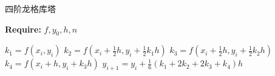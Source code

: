 \begin{algorithm}
\caption{四阶龙格库塔}
\label{alg:runge_kutta_4th}
{\bf Require:} $f, y_0, h, n$
\begin{algorithmic}[1]
	\State $k_1=f(x_i,y_i)$
	\State $k_2=f(x_i+\frac{1}{2}h,y_i+\frac{1}{2}k_1h)$
	\State $k_3=f(x_i+\frac{1}{2}h,y_i+\frac{1}{2}k_2h)$
	\State $k_4=f(x_i+h,y_i+k_3h)$
	\State $y_{i+1} = y_i + \frac{1}{6}(k_1+2k_2+2k_3+k_4)h$
\EndFor
\end{algorithmic}
\end{algorithm}